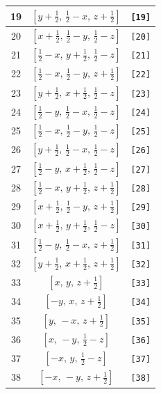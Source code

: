 \documentclass[fleqn,8pt]{jsarticle}
\begin{document}
\begin{longtable}{ccc}
19 & $\left[ y + \frac{1}{2},\, \frac{1}{2} - x,\, z + \frac{1}{2} \right]$ & {\tt [19]} \\ \hline
20 & $\left[ x + \frac{1}{2},\, \frac{1}{2} - y,\, \frac{1}{2} - z \right]$ & {\tt [20]} \\ \hline
21 & $\left[ \frac{1}{2} - x,\, y + \frac{1}{2},\, \frac{1}{2} - z \right]$ & {\tt [21]} \\ \hline
22 & $\left[ \frac{1}{2} - x,\, \frac{1}{2} - y,\, z + \frac{1}{2} \right]$ & {\tt [22]} \\ \hline
23 & $\left[ y + \frac{1}{2},\, x + \frac{1}{2},\, \frac{1}{2} - z \right]$ & {\tt [23]} \\ \hline
24 & $\left[ \frac{1}{2} - y,\, \frac{1}{2} - x,\, \frac{1}{2} - z \right]$ & {\tt [24]} \\ \hline
25 & $\left[ \frac{1}{2} - x,\, \frac{1}{2} - y,\, \frac{1}{2} - z \right]$ & {\tt [25]} \\ \hline
26 & $\left[ y + \frac{1}{2},\, \frac{1}{2} - x,\, \frac{1}{2} - z \right]$ & {\tt [26]} \\ \hline
27 & $\left[ \frac{1}{2} - y,\, x + \frac{1}{2},\, \frac{1}{2} - z \right]$ & {\tt [27]} \\ \hline
28 & $\left[ \frac{1}{2} - x,\, y + \frac{1}{2},\, z + \frac{1}{2} \right]$ & {\tt [28]} \\ \hline
29 & $\left[ x + \frac{1}{2},\, \frac{1}{2} - y,\, z + \frac{1}{2} \right]$ & {\tt [29]} \\ \hline
30 & $\left[ x + \frac{1}{2},\, y + \frac{1}{2},\, \frac{1}{2} - z \right]$ & {\tt [30]} \\ \hline
31 & $\left[ \frac{1}{2} - y,\, \frac{1}{2} - x,\, z + \frac{1}{2} \right]$ & {\tt [31]} \\ \hline
32 & $\left[ y + \frac{1}{2},\, x + \frac{1}{2},\, z + \frac{1}{2} \right]$ & {\tt [32]} \\ \hline
33 & $\left[ x,\, y,\, z + \frac{1}{2} \right]$ & {\tt [33]} \\ \hline
34 & $\left[ - y,\, x,\, z + \frac{1}{2} \right]$ & {\tt [34]} \\ \hline
35 & $\left[ y,\, - x,\, z + \frac{1}{2} \right]$ & {\tt [35]} \\ \hline
36 & $\left[ x,\, - y,\, \frac{1}{2} - z \right]$ & {\tt [36]} \\ \hline
37 & $\left[ - x,\, y,\, \frac{1}{2} - z \right]$ & {\tt [37]} \\ \hline
38 & $\left[ - x,\, - y,\, z + \frac{1}{2} \right]$ & {\tt [38]} \\ \hline

\end{longtable}
\end{document}
